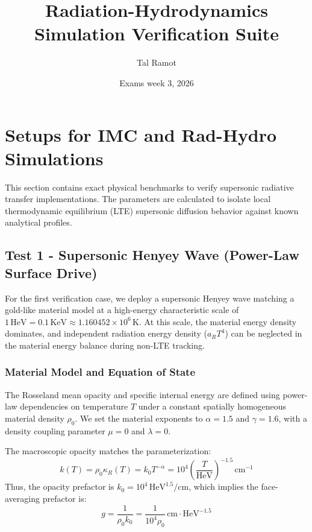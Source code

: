 \documentclass[11pt]{article}
\title{Radiation-Hydrodynamics Simulation Verification Suite}
\author{Tal Ramot}
\date{Exams week 3, 2026}
\begin{document}
\maketitle

\section{Setups for IMC and Rad-Hydro Simulations}

This section contains exact physical benchmarks to verify supersonic radiative transfer implementations. The parameters are calculated to isolate local thermodynamic equilibrium (LTE) supersonic diffusion behavior against known analytical profiles.

\subsection{Test 1 - Supersonic Henyey Wave (Power-Law Surface Drive)}
For the first verification case, we deploy a supersonic Henyey wave matching a gold-like material model at a high-energy characteristic scale of $1\,\text{HeV} = 0.1\,\text{KeV} \approx 1.160452 \times 10^6\,\text{K}$. At this scale, the material energy density dominates, and independent radiation energy density ($a_R T^4$) can be neglected in the material energy balance during non-LTE tracking.

\subsubsection{Material Model and Equation of State}
The Rosseland mean opacity and specific internal energy are defined using power-law dependencies on temperature $T$ under a constant spatially homogeneous material density $\rho_0$. 
We set the material exponents to $\alpha = 1.5$ and $\gamma = 1.6$, with a density coupling parameter $\mu = 0$ and $\lambda = 0$.

The macroscopic opacity matches the parameterization:
\begin{equation}
    k(T) = \rho_0 \kappa_R(T) = k_0 T^{-\alpha} = 10^4 \left(\frac{T}{\text{HeV}}\right)^{-1.5} \,\text{cm}^{-1}
\end{equation}
Thus, the opacity prefactor is $k_0 = 10^4\,\text{HeV}^{1.5}/\text{cm}$, which implies the face-averaging prefactor is:
\begin{equation}
    g = \frac{1}{\rho_0 k_0} = \frac{1}{10^4 \rho_0} \,\text{cm}\cdot\text{HeV}^{-1.5}
\end{equation}
\end{document}
